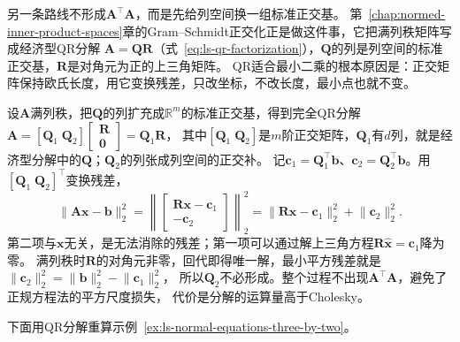 另一条路线不形成$\bm A^\top\bm A$，而是先给列空间换一组标准正交基。
第~\ref{chap:normed-inner-product-spaces}章的Gram--Schmidt正交化正是做这件事，它把满列秩矩阵写成经济型QR分解
$\bm A=\bm Q\bm R$（式~\eqref{eq:ls-qr-factorization}），$\bm Q$的列是列空间的标准正交基，$\bm R$是对角元为正的上三角矩阵。
QR适合最小二乘的根本原因是：正交矩阵保持欧氏长度，用它变换残差，只改坐标，不改长度，最小点也就不变。

设$\bm A$满列秩，把$\bm Q$的列扩充成$\mathbb R^m$的标准正交基，得到完全QR分解
$\bm A=[\bm Q_1\;\bm Q_2]\left[\begin{smallmatrix}\bm R\\\bm0\end{smallmatrix}\right]=\bm Q_1\bm R$，
其中$[\bm Q_1\;\bm Q_2]$是$m$阶正交矩阵，$\bm Q_1$有$d$列，就是经济型分解中的$\bm Q$；$\bm Q_2$的列张成列空间的正交补。
记$\bm c_1=\bm Q_1^\top\bm b$、$\bm c_2=\bm Q_2^\top\bm b$。用$[\bm Q_1\;\bm Q_2]^\top$变换残差，
\[
 \lVert\bm A\bm x-\bm b\rVert_2^2
 =\left\lVert\begin{bmatrix}\bm R\bm x-\bm c_1\\-\bm c_2\end{bmatrix}\right\rVert_2^2
 =\lVert\bm R\bm x-\bm c_1\rVert_2^2+\lVert\bm c_2\rVert_2^2 .
\]
第二项与$\bm x$无关，是无法消除的残差；第一项可以通过解上三角方程$\bm R\hat{\bm x}=\bm c_1$降为零。
满列秩时$\bm R$的对角元非零，回代即得唯一解，最小平方残差就是$\lVert\bm c_2\rVert_2^2=\lVert\bm b\rVert_2^2-\lVert\bm c_1\rVert_2^2$，
所以$\bm Q_2$不必形成。整个过程不出现$\bm A^\top\bm A$，避免了正规方程法的平方尺度损失，
代价是分解的运算量高于Cholesky。

下面用QR分解重算示例~\ref{ex:ls-normal-equations-three-by-two}。

